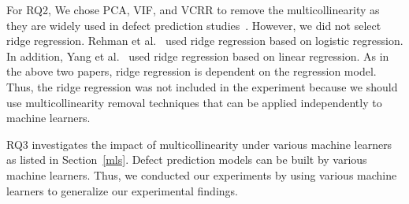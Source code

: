 For RQ2, We chose PCA, VIF, and VCRR to remove the multicollinearity as they are widely used in defect prediction studies~\cite{Holschuh2009ICSESAP, Zhang2017TSEaggregate, Pinzger2008FSEnetwork, Nagappan2008ICSEorg, Zimmermann2008ICSEnetwork, Eaddy2008TSEcrosscutting, Chen2012MSRExplaining,Shang2015EMSElog, Ambros2010MSRExtensiveComparison, Posnett2011ASEEcologicalInference, Ray2014FSElaguageandquality, Bettenburg2015EMSElocallyglobally, Zhao2015ISTPackageMetrics, MA2016ISTNetworkMeasures, Mensah2018ISTDuplex, Jiarpakdee2019TSE, Pinzger2008FSEnetwork, Cataldo2009TSEdependencies, Shihab2011FSEhighimpact, Bird2012MSRdistributed, Bettenburg2013EMSEinteractions, McIntosh2014MSRCodeReview, YangTSE2015cohesion, Palomba2017TSEsmell,Rajbahadur2017MSRRegression, McIntosh2017TSELongitudinal, Tantithamthavorn2018TSEClassRebalancing, Tantithamthavorn2019TSEAutomatedParameter, Thongtanunam2016ICSEowndershipcodequality}.
However, we did not select ridge regression. 
Rehman et al.~\cite{Rahman2013FSEbias} used ridge regression based on logistic regression. In addition, Yang et al.~\cite{Yang2018TRRidge} used ridge regression based on linear regression. As in the above two papers, ridge regression is dependent on the regression model. 
Thus, the ridge regression was not included in the experiment because we should use multicollinearity removal techniques that can be applied independently to machine learners.

RQ3 investigates the impact of multicollinearity under various machine learners as listed in Section~\ref{mls}. Defect prediction models can be built by various machine learners. Thus, we conducted our experiments by using various machine learners to generalize our experimental findings.


